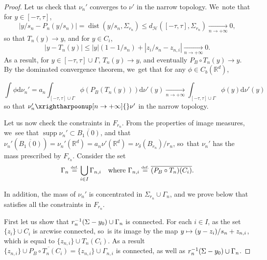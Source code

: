 \documentclass[JEP,XML,SOM,Unicode,NoFloatCountersInSection,published]{cedram}
\newcommand\mto{\mathchoice{\longmapsto}{\mapsto}{\mapsto}{\mapsto}}
\theoremstyle{definition}
\newcommand{\eqdef}{\ensuremath{\stackrel{\mbox{\upshape\tiny def.}}{=}}}
\newcommand{\RR}{\mathbb{R}}
\DeclareMathOperator{\dist}{dist}
\DeclareMathOperator{\supp}{supp}
\newcommand{\distH}{d_{\mathcal{H}}}
\newcommand\dd{\mathrm{d}}
\newcommand{\abs}[1]{\left\lvert#1\right\rvert}
\begin{document}
\begin{proof}
Let us check that $\nu_n'$ converges to $\nu'$ in the narrow topology. We~note that for $y\in [-\tau,\tau]$,
\[
|y/s_{n} - P_n(y/s_{n})| = \dist\left(y/s_{n}, \Sigma_{r_n}\right) \le \distH\left([-\tau, \tau], \Sigma_{r_n}\right)\xrightarrow[n\to +\infty]{} 0,
\]
so that $T_{n}(y)\to y$, and for $y\in C_{i}$,
\[
\abs{y-T_{n}(y)}\le \abs{y}(1-1/s_{n}) + \abs{z_i/s_n-z_{n,i}}\xrightarrow[n\to +\infty]{} 0.
\]
As a result, for $y\in [-\tau,\tau]\cup \Gamma$, $T_n(y)\to y$, and eventually $P_B\circ T_n(y)\to y$.
By the dominated convergence theorem, we~get that for any $\phi\in C_b(\RR^d)$,

\[
\int\phi\dd \nu_n'
=
a_n\int_{[-\tau,\tau]\cup \Gamma}\phi\left(P_B(T_n(y))\right)\dd \nu'(y)
\xrightarrow[n\to +\infty]{}
\int_{[-\tau,\tau]\cup \Gamma}\phi\left(y\right)\dd \nu'(y)
\]
so that $\nu_n'\xrightharpoonup[n\to +\infty]{}\nu'$ in the narrow topology.

Let us now check the constraints in $F_{r_n}$. From the properties of image measures, we~see that $\supp \nu_n'\subset \overline{B_{1}(0)}$, and that $\nu_n'(\overline{B_{1}(0)})=\nu_n'(\RR^d)=a_n\nu'(\RR^{d})= \nu_{\delta}(B_{r_n})/r_n$, so~that $\nu_n'$ has the mass prescribed by $F_{r_n}$. Consider the set
\begin{equation}\label{eq.defgamman}
\Gamma_n\eqdef
\bigcup_{i\in I} \Gamma_{n,i}
\quad
\mbox{where }
\Gamma_{n,i}\eqdef \overline{(P_B\circ T_{n})(C_{i})}.
\end{equation}

In addition, the mass of $\nu_n'$ is concentrated in $\Sigma_{r_n}\cup \Gamma_n$, and we prove below that satisfies all the constraints in $F_{r_{n}}$.

First let us show that $r_n^{-1}(\Sigma -\nobreak y_0) \cup\nobreak \Gamma_n$ is connected. For each $i\in I$, as the set $\{z_{i}\}\cup C_{i}$ is arcwise connected, so~is its image by the map $y\mto (y-z_{i})/s_n+z_{n,i}$, which is equal to $\{z_{n,i}\}\cup T_n(C_i)$. As a result $\{z_{n,i}\}\cup \overline{P_B\circ T_n(C_i)} = \{z_{n,i}\}\cup \Gamma_{n,i}$ is connected, as well as $r_n^{-1}(\Sigma -\nobreak y_0) \cup\nobreak \Gamma_n$.


\end{proof}
\end{document}
